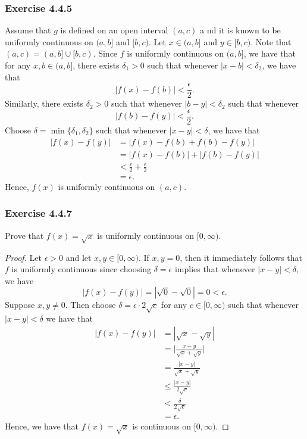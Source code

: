 \subsubsection{Exercise 4.4.5} Assume that \( g  \) is defined on an open interval \( (a,c) \) a nd it is known to be uniformly continuous on \( (a,b]  \) and \( [b, c) \). Let \( x \in (a,b] \) and \( y \in [b,c) \). Note that \( (a,c) = (a,b] \cup [b,c) \). Since \( f  \) is uniformly continuous on \( (a,b] \), we have that for any \( x, b \in (a,b] \), there exists \( \delta_1 > 0  \) such that whenever \( | x - b  | < \delta_2   \), we have that 
\[ | f(x) - f(b)  | < \frac{ \epsilon  }{ 2 } .\] Similarly, there exists \( \delta_2 > 0  \) such that whenever \( | b - y  | < \delta_2 \) such that whenever 
\[  | f(b) - f(y) | < \frac{ \epsilon  }{ 2 } . \]Choose \( \delta  =  \min \{ \delta_1, \delta_2  \}  \) such that whenever \( | x - y  | < \delta  \), we have that 
\begin{align*}
    | f(x) - f(y)  | &= | f(x) - f(b) + f(b) - f(y)  |  \\
                     &= | f(x) - f(b)  | + | f(b) - f(y) | \\
                     &< \frac{ \epsilon  }{ 2 } + \frac{ \epsilon  }{ 2 } \\ 
                     &= \epsilon.
\end{align*}
Hence, \( f(x)  \) is uniformly continuous on \( (a,c) \).





\subsubsection{Exercise 4.4.7} Prove that \( f(x) = \sqrt{ x  }  \) is uniformly continuous on \( [0,\infty ) \).
\begin{proof}
    Let \( \epsilon > 0  \) and let \( x, y \in [0, \infty ) \). If \( x,y = 0   \), then it immediately follows that \( f  \) is uniformly continuous since choosing \( \delta = \epsilon  \) implies that whenever \( | x - y  | < \delta  \), we have 
    \[ | f(x) - f(y) | = | \sqrt{ 0 } - \sqrt{ 0 }   | = 0 < \epsilon.   \]Suppose \( x,y \neq  0  \). Then choose \( \delta = \epsilon  \cdot 2\sqrt{ c  }  \) for any \( c \in [0, \infty)\) such that whenever \( | x - y  | < \delta  \) we have that
    \begin{align*}
        | f(x) - f(y)  | &= | \sqrt{ x } - \sqrt{ y }  |  \\
                         &= \Big| \frac{ x - y  }{ \sqrt{ x  } + \sqrt{ y }  }  \Big| \\
                         &= \frac{ | x - y  |  }{  \sqrt{ x  } + \sqrt{ y }    } \\
                         &\leq \frac{ | x - y  |  }{   2 \sqrt{ c }    }  \\
                         &< \frac{ \delta  }{ 2 \sqrt{ c }  }  \\
                         &= \epsilon. 
    \end{align*}
    Hence, we have that \( f(x)  = \sqrt{ x  }  \) is continuous on \( [0,\infty) \).
\end{proof}

